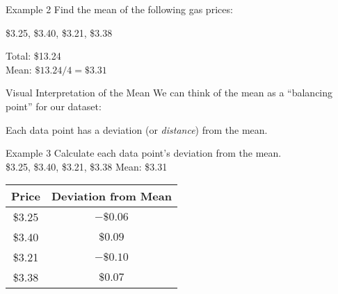 \documentclass[t]{beamer}
\begin{document}
\begin{frame}{Example 2}
Find the mean of the following gas prices: 
\begin{center}
\$3.25, \$3.40, \$3.21, \$3.38
\end{center}
\vspace{8pt}	\pause
Total: \$13.24	\newline\\	\pause
Mean: $\$13.24 / 4 = \$3.31$
\end{frame}

\begin{frame}{Visual Interpretation of the Mean}
We can think of the mean as a ``balancing point'' for our dataset:	\vspace{11pt}
\begin{center}
\end{center}	\vspace{10pt}	\pause

Each data point has a deviation (or \emph{distance}) from the mean.
\end{frame}

\begin{frame}{Example 3}
Calculate each data point's deviation from the mean.	\newline\\	
\$3.25, \$3.40, \$3.21, \$3.38	\qquad Mean: \$3.31	\newline\\	\pause

\begin{center}
\begin{tabular}{c|c}
\textbf{Price} & \textbf{Deviation from Mean}	\\	\hline
\$3.25			&	$-\$0.06$	\\
\$3.40			&	$\$0.09$	\\
\$3.21			&	$-\$0.10$	\\
\$3.38			&	$\$0.07$	\\
\end{tabular}
\end{center}
\end{frame}
\end{document}
